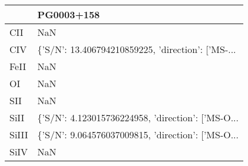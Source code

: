 \begin{tabular}{ll}
\toprule
{} &                                         PG0003+158 \\
\midrule
CII   &                                                NaN \\
CIV   &  \{'S/N': 13.406794210859225, 'direction': ['MS-... \\
FeII  &                                                NaN \\
OI    &                                                NaN \\
SII   &                                                NaN \\
SiII  &  \{'S/N': 4.123015736224958, 'direction': ['MS-O... \\
SiIII &  \{'S/N': 9.064576037009815, 'direction': ['MS-O... \\
SiIV  &                                                NaN \\
\bottomrule
\end{tabular}
